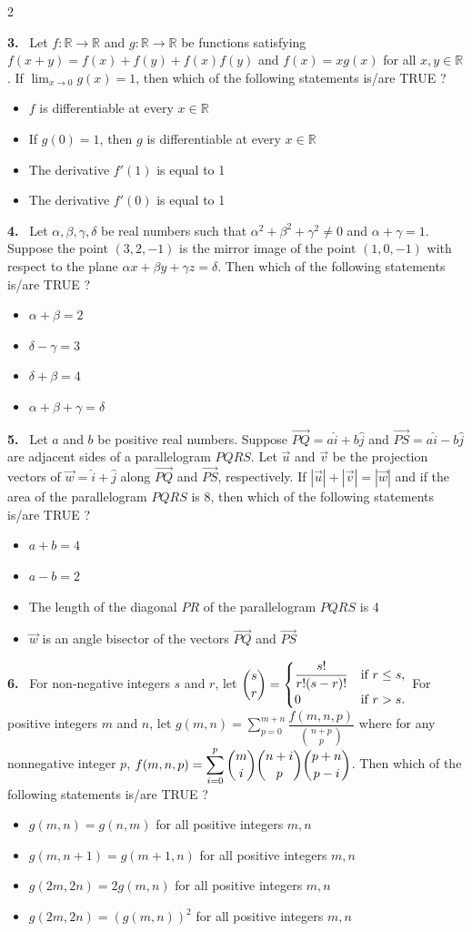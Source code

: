 \documentclass[10pt]{extarticle}
\newcommand{\qn}[1]{\par\smallskip\noindent\textbf{#1.}~}
\newenvironment{qoptions}{\begin{itemize}[leftmargin=1.8em,itemsep=1pt,topsep=2pt,label={}]}{\end{itemize}}
\newcommand{\opt}[2]{\item[(#1)] #2}
\begin{document}
\begin{multicols}{2}
\qn{3} Let $f:\mathbb R\to\mathbb R$ and $g:\mathbb R\to\mathbb R$ be functions satisfying $f(x+y)=f(x)+f(y)+f(x)f(y)$ and $f(x)=xg(x)$ for all $x,y\in\mathbb R$. If $\displaystyle\lim_{x\to0}g(x)=1$, then which of the following statements is/are TRUE ?
\begin{qoptions}
\opt{A}{$f$ is differentiable at every $x\in\mathbb R$}
\opt{B}{If $g(0)=1$, then $g$ is differentiable at every $x\in\mathbb R$}
\opt{C}{The derivative $f'(1)$ is equal to 1}
\opt{D}{The derivative $f'(0)$ is equal to 1}
\end{qoptions}

\qn{4} Let $\alpha,\beta,\gamma,\delta$ be real numbers such that $\alpha^2+\beta^2+\gamma^2\ne0$ and $\alpha+\gamma=1$. Suppose the point $(3,2,-1)$ is the mirror image of the point $(1,0,-1)$ with respect to the plane $\alpha x+\beta y+\gamma z=\delta$. Then which of the following statements is/are TRUE ?
\begin{qoptions}
\opt{A}{$\alpha+\beta=2$}
\opt{B}{$\delta-\gamma=3$}
\opt{C}{$\delta+\beta=4$}
\opt{D}{$\alpha+\beta+\gamma=\delta$}
\end{qoptions}

\qn{5} Let $a$ and $b$ be positive real numbers. Suppose $\overrightarrow{PQ}=a\hat i+b\hat j$ and $\overrightarrow{PS}=a\hat i-b\hat j$ are adjacent sides of a parallelogram $PQRS$. Let $\vec u$ and $\vec v$ be the projection vectors of $\vec w=\hat i+\hat j$ along $\overrightarrow{PQ}$ and $\overrightarrow{PS}$, respectively. If $|\vec u|+|\vec v|=|\vec w|$ and if the area of the parallelogram $PQRS$ is 8, then which of the following statements is/are TRUE ?
\begin{qoptions}
\opt{A}{$a+b=4$}
\opt{B}{$a-b=2$}
\opt{C}{The length of the diagonal $PR$ of the parallelogram $PQRS$ is 4}
\opt{D}{$\vec w$ is an angle bisector of the vectors $\overrightarrow{PQ}$ and $\overrightarrow{PS}$}
\end{qoptions}

\qn{6} For non-negative integers $s$ and $r$, let $\dbinom sr=\begin{cases}\dfrac{s!}{r!(s-r)!} & \text{if } r\le s,\\[4pt] 0 & \text{if } r>s.\end{cases}$ For positive integers $m$ and $n$, let $g(m,n)=\displaystyle\sum_{p=0}^{m+n}\dfrac{f(m,n,p)}{\binom{n+p}{p}}$ where for any nonnegative integer $p$, $f(m,n,p)=\displaystyle\sum_{i=0}^{p}\dbinom mi\dbinom{n+i}p\dbinom{p+n}{p-i}$. Then which of the following statements is/are TRUE ?
\begin{qoptions}
\opt{A}{$g(m,n)=g(n,m)$ for all positive integers $m,n$}
\opt{B}{$g(m,n+1)=g(m+1,n)$ for all positive integers $m,n$}
\opt{C}{$g(2m,2n)=2g(m,n)$ for all positive integers $m,n$}
\opt{D}{$g(2m,2n)=(g(m,n))^2$ for all positive integers $m,n$}
\end{qoptions}


\end{multicols}
\end{document}
